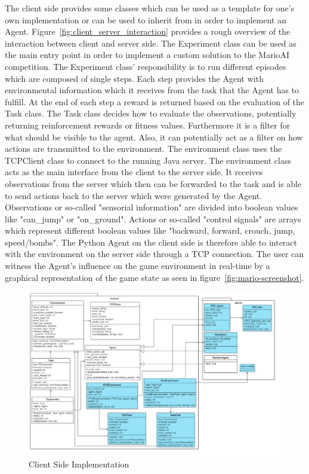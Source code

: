 \documentclass[]{article}
\begin{document}
The client side provides some classes which can be used as a template for one's own implementation or can be used to inherit from in order to implement an Agent. Figure~\ref{fig:client_server_interaction} provides a rough overview of the interaction between client and server side. The Experiment class can be used as the main entry point in order to implement a custom solution to the MarioAI competition.  The Experiment class' responsibility is to run different episodes which are composed of single steps. Each step provides the Agent with environmental information which it receives from the task that the Agent has to fulfill. At the end of each step a reward is returned based on the evaluation of the Task class. The Task class decides how to evaluate the observations, potentially returning reinforcement rewards or fitness values. Furthermore it is a filter for what should be visible to the agent. Also, it can potentially act as a filter on how actions are transmitted to the environment. The environment class uses the TCPClient class to connect to the running Java server. The environment class acts as the main interface from the client to the server side. It receives observations from the server which then can be forwarded to the task and is able to send actions back to the server which were generated by the Agent. Observations or so-called "sensorial information" are divided into boolean values like "can\_jump" or "on\_ground". Actions or so-called "control signals" are arrays which represent different boolean values like "backward, forward, crouch, jump, speed/bombs". The Python Agent on the client side is therefore able to interact with the environment on the server side through a TCP connection. The user can witness the Agent's influence on the game environment in real-time by a graphical representation of the game state as seen in figure~\ref{fig:mario-screenshot}.


\begin{figure}[h]
    \centering
    \includegraphics[width=1.0\linewidth]{images/client_side_uml.png}
    \caption{Client Side Implementation}
    \label{fig:client_side_uml}
\end{figure}
\end{document}
